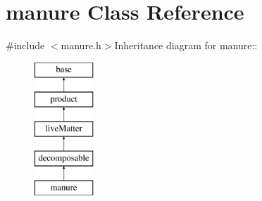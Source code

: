 \hypertarget{classmanure}{
\section{manure Class Reference}
\label{classmanure}
}


{\ttfamily \#include $<$manure.h$>$}Inheritance diagram for manure::\begin{figure}[H]
\begin{center}
\leavevmode
\includegraphics[height=5cm]{classmanure}
\end{center}
\end{figure}
